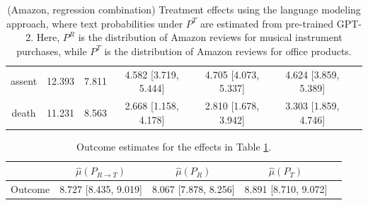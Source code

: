 \documentclass{article}
\begin{document}
\begin{table}[!ht]
\begin{tabular}{c|cccccc}
    assent      &             12.393 &              7.811 & 4.582 [3.719, 5.444]             & 4.705 [4.073, 5.337] & 4.624 [3.859, 5.389]  \\
    death       &             11.231 &              8.563 & 2.668 [1.158, 4.178]             & 2.810 [1.678, 3.942] & 3.303 [1.859, 4.746]  \\
 \bottomrule
    \end{tabular}
    \caption{(Amazon, regression combination) Treatment effects using the language modeling approach, where text probabilities under $P^T$ are estimated from pre-trained GPT-2. Here, $P^R$ is the distribution of Amazon reviews for musical instrument purchases, while $P^T$ is the distribution of Amazon reviews for office products.}
    \label{tab:results_clm_gpt2_amazon_synthetic_predreg}
\end{table}

\begin{table}[!ht]
    \centering
    \begin{tabular}{c|cccc}
\toprule
     & $\hat{\mu}(P_{R \rightarrow T})$   & $\hat{\mu}(P_R)$     & $\hat{\mu}(P_T)$     \\
\midrule
    Outcome & 8.727 [8.435, 9.019]               & 8.067 [7.878, 8.256] & 8.891 [8.710, 9.072] \\
\bottomrule
    \end{tabular}
    \caption{Outcome estimates for the effects in Table \ref{tab:results_clm_gpt2_amazon_synthetic_predreg}.}
    \label{tab:results_clm_gpt2_amazon_synthetic_predreg_outcome}
\end{table}
\end{document}
